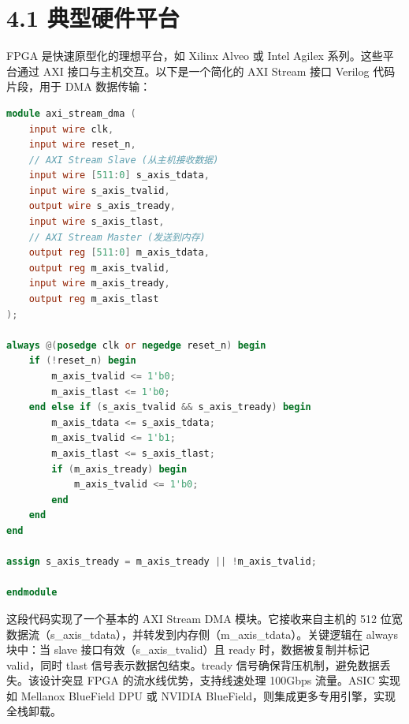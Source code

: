 \section{4.1 典型硬件平台}
FPGA 是快速原型化的理想平台，如 Xilinx Alveo 或 Intel Agilex 系列。这些平台通过 AXI 接口与主机交互。以下是一个简化的 AXI Stream 接口 Verilog 代码片段，用于 DMA 数据传输：\par
\begin{lstlisting}[language=verilog]
module axi_stream_dma (
    input wire clk,
    input wire reset_n,
    // AXI Stream Slave (从主机接收数据)
    input wire [511:0] s_axis_tdata,
    input wire s_axis_tvalid,
    output wire s_axis_tready,
    input wire s_axis_tlast,
    // AXI Stream Master (发送到内存)
    output reg [511:0] m_axis_tdata,
    output reg m_axis_tvalid,
    input wire m_axis_tready,
    output reg m_axis_tlast
);

always @(posedge clk or negedge reset_n) begin
    if (!reset_n) begin
        m_axis_tvalid <= 1'b0;
        m_axis_tlast <= 1'b0;
    end else if (s_axis_tvalid && s_axis_tready) begin
        m_axis_tdata <= s_axis_tdata;
        m_axis_tvalid <= 1'b1;
        m_axis_tlast <= s_axis_tlast;
        if (m_axis_tready) begin
            m_axis_tvalid <= 1'b0;
        end
    end
end

assign s_axis_tready = m_axis_tready || !m_axis_tvalid;

endmodule
\end{lstlisting}
这段代码实现了一个基本的 AXI Stream DMA 模块。它接收来自主机的 512 位宽数据流（s\_{}axis\_{}tdata），并转发到内存侧（m\_{}axis\_{}tdata）。关键逻辑在 always 块中：当 slave 接口有效（s\_{}axis\_{}tvalid）且 ready 时，数据被复制并标记 valid，同时 tlast 信号表示数据包结束。tready 信号确保背压机制，避免数据丢失。该设计突显 FPGA 的流水线优势，支持线速处理 100Gbps 流量。ASIC 实现如 Mellanox BlueField DPU 或 NVIDIA BlueField，则集成更多专用引擎，实现全栈卸载。\par
